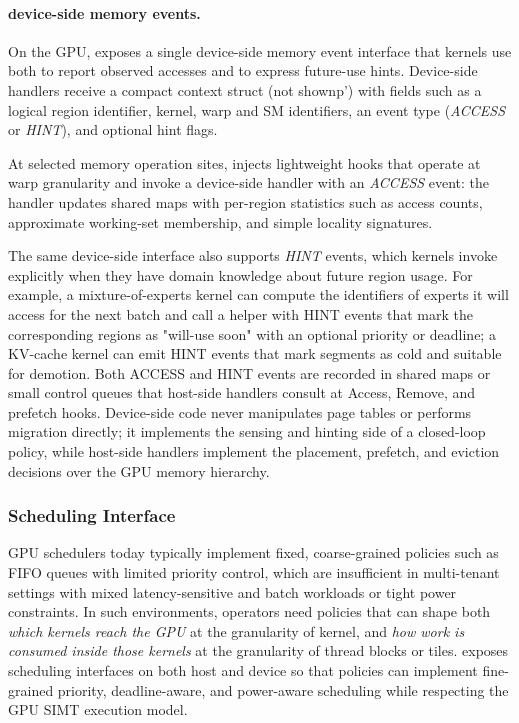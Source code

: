 \paragraph{device-side memory events.}

On the GPU, \sys exposes a single device-side memory event interface that kernels
use both to report observed accesses and to express future-use hints. Device-side
handlers receive a compact context struct (not shownp') with fields such as a logical
region identifier, kernel, warp and SM identifiers, an event type (\emph{ACCESS}
or \emph{HINT}), and optional hint flags.

At selected memory operation sites, \sys injects lightweight hooks that operate at
warp granularity and invoke a device-side \sys handler with an \emph{ACCESS} event:
the handler updates shared maps with per-region statistics such as access counts,
approximate working-set membership, and simple locality signatures.\

The same device-side interface also supports \emph{HINT} events, which kernels
invoke explicitly when they have domain knowledge about future region usage. For
example, a mixture-of-experts kernel can compute the identifiers of experts it
will access for the next batch and call a \sys helper with HINT events that mark
the corresponding regions as "will-use soon" with an optional priority or deadline;
a KV-cache kernel can emit HINT events that mark segments as cold and suitable for
demotion. Both ACCESS and HINT events are recorded in shared maps or small control
queues that host-side \sys handlers consult at Access, Remove, and prefetch hooks.
Device-side code never manipulates page tables or performs migration directly; it
implements the sensing and hinting side of a closed-loop policy, while host-side
\sys handlers implement the placement, prefetch, and eviction decisions over the
GPU memory hierarchy.


\subsubsection{Scheduling Interface}
\label{sec:design-sched}

GPU schedulers today typically implement fixed, coarse-grained policies such as FIFO
queues with limited priority control, which are insufficient in multi-tenant settings
with mixed latency-sensitive and batch workloads or tight power constraints. In such
environments, operators need policies that can shape both \emph{which kernels reach
the GPU} at the granularity of kernel, and \emph{how work is consumed inside those kernels} at the granularity of thread blocks or tiles. \sys exposes scheduling interfaces on both host and device
so that policies can implement fine-grained priority, deadline-aware, and power-aware
scheduling while respecting the GPU SIMT execution model.

